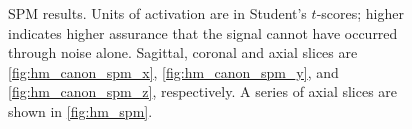 \begin{figure}[H]
\centering
{}
\caption{\ac{SPM} results. Units of activation are in Student's $t$-scores; higher indicates higher
        assurance that the signal cannot have occurred through noise alone.
        Sagittal, coronal and axial slices  are
        \autoref{fig:hm_canon_spm_x}, \autoref{fig:hm_canon_spm_y}, and
         \autoref{fig:hm_canon_spm_z}, respectively. A series of axial slices are
         shown in \autoref{fig:hm_spm}. }
\label{fig:hm_canon_spm}
\end{figure}

